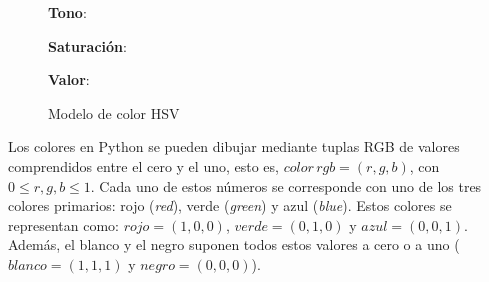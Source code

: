 \begin{figure}[!htbp]
    \begin{minipage}[h]{\textwidth}
        \centering
        \parbox[c][1cm]{\textwidth}{\centering \textbf{Tono}: \\}
        \label{fig:hue}
    \end{minipage}
    \begin{minipage}[h]{\textwidth}
        \centering
        \parbox[c][1cm]{\textwidth}{}{\centering \textbf{Saturación}: \\}
        \label{fig:saturation}
    \end{minipage}
    \begin{minipage}[h]{\textwidth}
        \centering
        \parbox[c][1cm]{\textwidth}{\centering \textbf{Valor}: \\}
        \label{fig:value}
    \end{minipage}
    \caption{Modelo de color HSV}
    \label{fig:hsv}
\end{figure}

Los colores en Python se pueden dibujar mediante tuplas RGB de valores comprendidos entre el cero y el uno, esto es, $color \, rgb = (r, g, b)$, con $0 \leq r, g, b \leq 1$. Cada uno de estos números se corresponde con uno de los tres colores primarios: rojo (\textit{red}), verde (\textit{green}) y azul (\textit{blue}). Estos colores se representan como: $rojo = (1, 0, 0)$, $verde = (0, 1, 0)$ y $azul = (0, 0, 1)$. Además, el blanco y el negro suponen todos estos valores a cero o a uno ($blanco = (1, 1, 1)$ y $negro = (0, 0, 0)$). \\

